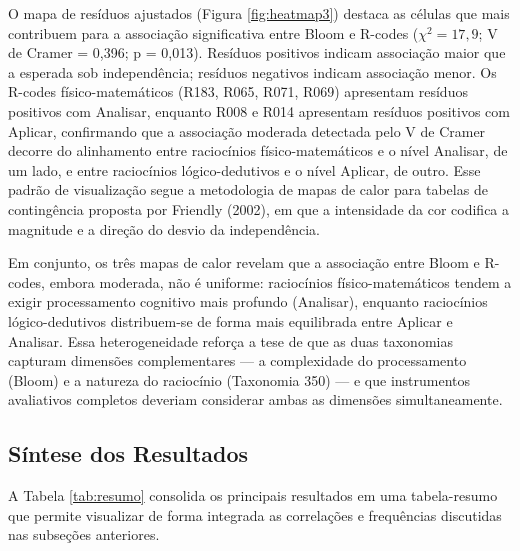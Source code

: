 \documentclass[
  12pt,
  a4paper,
  twoside,
  brazilian
]{article}
\begin{document}
O mapa de resíduos ajustados (Figura \ref{fig:heatmap3}) destaca as
células que mais contribuem para a associação significativa entre Bloom
e R-codes (\(\chi^2 = 17,9\); V de Cramer = 0,396; p = 0,013). Resíduos
positivos indicam associação maior que a esperada sob independência;
resíduos negativos indicam associação menor. Os R-codes
físico-matemáticos (R183, R065, R071, R069) apresentam resíduos
positivos com Analisar, enquanto R008 e R014 apresentam resíduos
positivos com Aplicar, confirmando que a associação moderada detectada
pelo V de Cramer decorre do alinhamento entre raciocínios
físico-matemáticos e o nível Analisar, de um lado, e entre raciocínios
lógico-dedutivos e o nível Aplicar, de outro. Esse padrão de
visualização segue a metodologia de mapas de calor para tabelas de
contingência proposta por Friendly (2002), em que a intensidade da cor
codifica a magnitude e a direção do desvio da independência.

Em conjunto, os três mapas de calor revelam que a associação entre
Bloom e R-codes, embora moderada, não é uniforme: raciocínios
físico-matemáticos tendem a exigir processamento cognitivo mais
profundo (Analisar), enquanto raciocínios lógico-dedutivos distribuem-se
de forma mais equilibrada entre Aplicar e Analisar. Essa heterogeneidade
reforça a tese de que as duas taxonomias capturam dimensões
complementares --- a complexidade do processamento (Bloom) e a natureza
do raciocínio (Taxonomia 350) --- e que instrumentos avaliativos
completos deveriam considerar ambas as dimensões simultaneamente.

\subsection{Síntese dos Resultados}\label{suxedntese-dos-resultados}

A Tabela \ref{tab:resumo} consolida os principais resultados em uma tabela-resumo que
permite visualizar de forma integrada as correlações e frequências
discutidas nas subseções anteriores.
\end{document}
